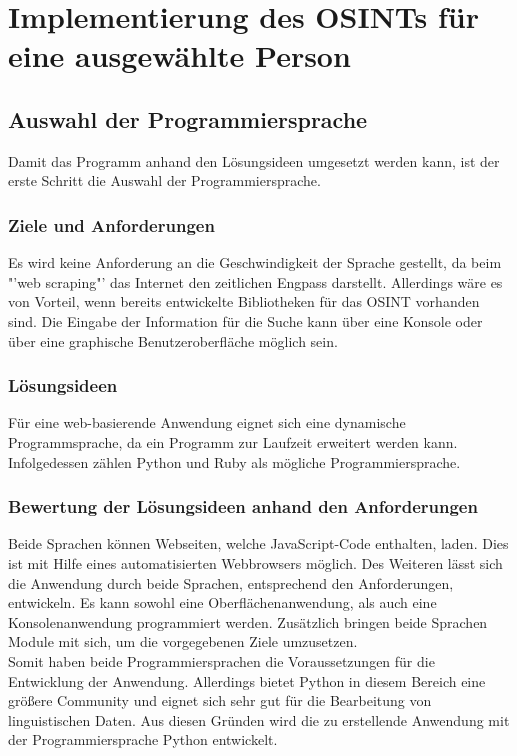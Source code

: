 
\chapter{Implementierung des OSINTs für eine ausgewählte Person}  %
\label{cha:Informationsbeschaffung einer ausgewählten Person} %
\section{Auswahl der Programmiersprache}
Damit das Programm anhand den Lösungsideen umgesetzt werden kann, ist der erste Schritt die Auswahl der Programmiersprache.
	\subsection{Ziele und Anforderungen}
		Es wird keine Anforderung an die Geschwindigkeit der Sprache gestellt, da beim "'web scraping"' das Internet den zeitlichen Engpass darstellt. Allerdings wäre es von Vorteil, wenn bereits entwickelte Bibliotheken für das OSINT vorhanden sind. Die Eingabe der Information für die Suche kann über eine Konsole oder über eine graphische Benutzeroberfläche möglich sein.
	\subsection{Lösungsideen}
		Für eine web-basierende Anwendung eignet sich eine dynamische Programmsprache, da ein Programm zur Laufzeit erweitert werden kann. Infolgedessen zählen Python und Ruby als mögliche Programmiersprache.
	\subsection{Bewertung der Lösungsideen anhand den Anforderungen}
		Beide Sprachen können Webseiten, welche JavaScript-Code enthalten, laden. Dies ist mit Hilfe eines automatisierten Webbrowsers möglich. Des Weiteren lässt sich die Anwendung durch beide Sprachen, entsprechend den Anforderungen, entwickeln. Es kann sowohl eine Oberflächenanwendung, als auch eine Konsolenanwendung programmiert werden. Zusätzlich bringen beide Sprachen Module mit sich, um die vorgegebenen Ziele umzusetzen.\\ Somit haben beide Programmiersprachen die Voraussetzungen für die Entwicklung der Anwendung. Allerdings bietet Python in diesem Bereich eine größere Community und eignet sich sehr gut für die Bearbeitung von linguistischen Daten. \cite{bird2009natural} Aus diesen Gründen wird die zu erstellende Anwendung mit der Programmiersprache Python entwickelt.

